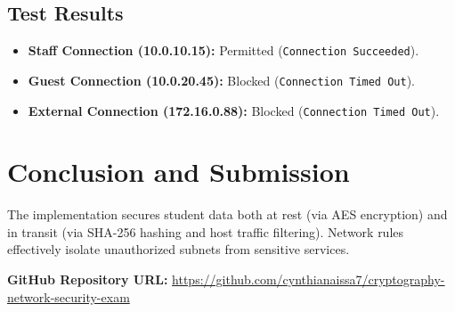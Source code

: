 \documentclass[12pt,a4paper]{article}
\begin{document}
\subsection{Test Results}
\begin{itemize}
    \item \textbf{Staff Connection (10.0.10.15):} Permitted (\texttt{Connection Succeeded}).
    \item \textbf{Guest Connection (10.0.20.45):} Blocked (\texttt{Connection Timed Out}).
    \item \textbf{External Connection (172.16.0.88):} Blocked (\texttt{Connection Timed Out}).
\end{itemize}

\section{Conclusion and Submission}
The implementation secures student data both at rest (via AES encryption) and in transit (via SHA-256 hashing and host traffic filtering). Network rules effectively isolate unauthorized subnets from sensitive services.

\textbf{GitHub Repository URL:} \url{https://github.com/cynthianaissa7/cryptography-network-security-exam}
\end{document}
